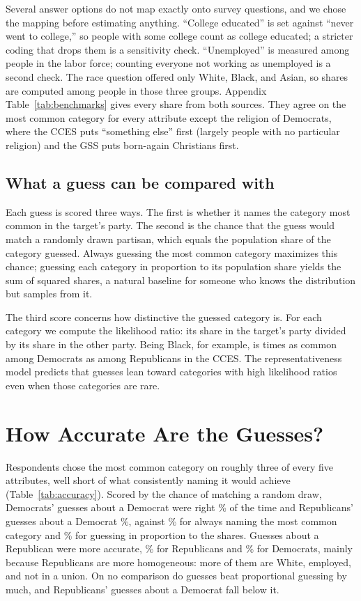 \documentclass[11pt]{article}
\begin{document}
Several answer options do not map exactly onto survey questions, and we chose the mapping before estimating anything. ``College educated'' is set against ``never went to college,'' so people with some college count as college educated; a stricter coding that drops them is a sensitivity check. ``Unemployed'' is measured among people in the labor force; counting everyone not working as unemployed is a second check. The race question offered only White, Black, and Asian, so shares are computed among people in those three groups. Appendix Table~\ref{tab:benchmarks} gives every share from both sources. They agree on the most common category for every attribute except the religion of Democrats, where the CCES puts ``something else'' first (largely people with no particular religion) and the GSS puts born-again Christians first.

\subsection{What a guess can be compared with}

Each guess is scored three ways. The first is whether it names the category most common in the target's party. The second is the chance that the guess would match a randomly drawn partisan, which equals the population share of the category guessed. Always guessing the most common category maximizes this chance; guessing each category in proportion to its population share yields the sum of squared shares, a natural baseline for someone who knows the distribution but samples from it.

The third score concerns how distinctive the guessed category is. For each category we compute the likelihood ratio: its share in the target's party divided by its share in the other party. Being Black, for example, is \blackLr{} times as common among Democrats as among Republicans in the CCES. The representativeness model predicts that guesses lean toward categories with high likelihood ratios even when those categories are rare.

\section{How Accurate Are the Guesses?}

Respondents chose the most common category on roughly three of every five attributes, well short of what consistently naming it would achieve (Table~\ref{tab:accuracy}). Scored by the chance of matching a random draw, Democrats' guesses about a Democrat were right \hitDemIn\% of the time and Republicans' guesses about a Democrat \hitDemOut\%, against \bestDem\% for always naming the most common category and \matchDem\% for guessing in proportion to the shares. Guesses about a Republican were more accurate, \hitRepIn\% for Republicans and \hitRepOut\% for Democrats, mainly because Republicans are more homogeneous: more of them are White, employed, and not in a union. On no comparison do guesses beat proportional guessing by much, and Republicans' guesses about a Democrat fall below it.
\end{document}
